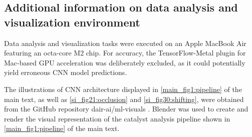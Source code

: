 \subsection{Additional information on data analysis and visualization environment}
Data analysis and visualization tasks were executed on an Apple MacBook Air featuring an octa-core M2 chip.
For accuracy, the TensorFlow-Metal plugin for Mac-based GPU acceleration was deliberately excluded,
as it could potentially yield erroneous CNN model predictions.

The illustrations of CNN architecture displayed in \cref{main_fig1:pipeline} of the main text,
as well as \cref{si_fig21:occlusion} and \cref{si_fig30:shifting},
were obtained from the GitHub repository dair-ai/ml-visuals \cite{Saravia_ML_Visuals_2021}.
Blender was used to create and render the visual representation of the catalyst analysis pipeline shown in \cref{main_fig1:pipeline} of the main text.

